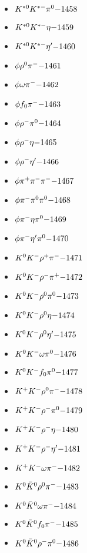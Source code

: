 \begin{multicols}{3}
\begin{itemize}
 \item $ K^{*0} K^{*-} \pi^{0} \hfill{-1458}$
 \item $ K^{*0} K^{*-} \eta \hfill{-1459}$
 \item $ K^{*0} K^{*-} {\eta^{\prime}} \hfill{-1460}$
 \item $ \phi \rho^{0} \pi^{-} \hfill{-1461}$
 \item $ \phi \omega \pi^{-} \hfill{-1462}$
 \item $ \phi f_{0} \pi^{-} \hfill{-1463}$
 \item $ \phi \rho^{-} \pi^{0} \hfill{-1464}$
 \item $ \phi \rho^{-} \eta \hfill{-1465}$
 \item $ \phi \rho^{-} {\eta^{\prime}} \hfill{-1466}$
 \item $ \phi \pi^{+} \pi^{-} \pi^{-} \hfill{-1467}$
 \item $ \phi \pi^{-} \pi^{0} \pi^{0} \hfill{-1468}$
 \item $ \phi \pi^{-} \eta \pi^{0} \hfill{-1469}$
 \item $ \phi \pi^{-} {\eta^{\prime}} \pi^{0} \hfill{-1470}$
 \item $ K^{0} K^{-} \rho^{+} \pi^{-} \hfill{-1471}$
 \item $ K^{0} K^{-} \rho^{-} \pi^{+} \hfill{-1472}$
 \item $ K^{0} K^{-} \rho^{0} \pi^{0} \hfill{-1473}$
 \item $ K^{0} K^{-} \rho^{0} \eta \hfill{-1474}$
 \item $ K^{0} K^{-} \rho^{0} {\eta^{\prime}} \hfill{-1475}$
 \item $ K^{0} K^{-} \omega \pi^{0} \hfill{-1476}$
 \item $ K^{0} K^{-} f_{0} \pi^{0} \hfill{-1477}$
 \item $ K^{+} K^{-} \rho^{0} \pi^{-} \hfill{-1478}$
 \item $ K^{+} K^{-} \rho^{-} \pi^{0} \hfill{-1479}$
 \item $ K^{+} K^{-} \rho^{-} \eta \hfill{-1480}$
 \item $ K^{+} K^{-} \rho^{-} {\eta^{\prime}} \hfill{-1481}$
 \item $ K^{+} K^{-} \omega \pi^{-} \hfill{-1482}$
 \item $ K^{0} \bar{K}^{0} \rho^{0} \pi^{-} \hfill{-1483}$
 \item $ K^{0} \bar{K}^{0} \omega \pi^{-} \hfill{-1484}$
 \item $ K^{0} \bar{K}^{0} f_{0} \pi^{-} \hfill{-1485}$
 \item $ K^{0} \bar{K}^{0} \rho^{-} \pi^{0} \hfill{-1486}$

\end{itemize}
\end{multicols}

